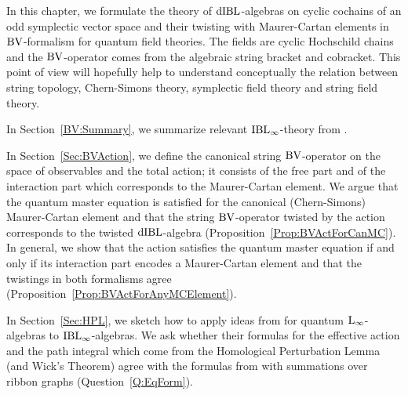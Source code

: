 \documentclass[\MainFolder/Text.tex]{subfiles}
\begin{document}
In this chapter, we formulate the theory of $\mathrm{dIBL}$-algebras on cyclic cochains of an odd symplectic vector space and their twisting with Maurer-Cartan elements in $\mathrm{BV}$-formalism for quantum field theories. The fields are cyclic Hochschild chains and the $\mathrm{BV}$-operator comes from the algebraic string bracket and cobracket. This point of view will hopefully help to understand conceptually the relation between string topology, Chern-Simons theory, symplectic field theory and string field theory.

In Section~\ref{BV:Summary}, we summarize relevant $\mathrm{IBL}_\infty$-theory from \cite{Cieliebak2015}.

In Section~\ref{Sec:BVAction}, we define the canonical string $\mathrm{BV}$-operator on the space of observables and the total action; it consists of the free part and of the interaction part which corresponds to the Maurer-Cartan element. We argue that the quantum master equation is satisfied for the canonical (Chern-Simons) Maurer-Cartan element and that the string $\mathrm{BV}$-operator twisted by the action corresponds to the twisted $\mathrm{dIBL}$-algebra (Proposition~\ref{Prop:BVActForCanMC}). In general, we show that the action satisfies the quantum master equation if and only if its interaction part encodes a Maurer-Cartan element and that the twistings in both formalisms agree (Proposition~\ref{Prop:BVActForAnyMCElement}).

In Section~\ref{Sec:HPL}, we sketch how to apply ideas from \cite{Doubek2018} for quantum $\mathrm{L}_\infty$-algebras to $\mathrm{IBL}_\infty$-algebras. We ask whether their formulas for the effective action and the path integral which come from the Homological Perturbation Lemma (and Wick's Theorem) agree with the formulas from \cite{Cieliebak2015} with summations over ribbon graphs (Question~\ref{Q:EqForm}).
\end{document}

